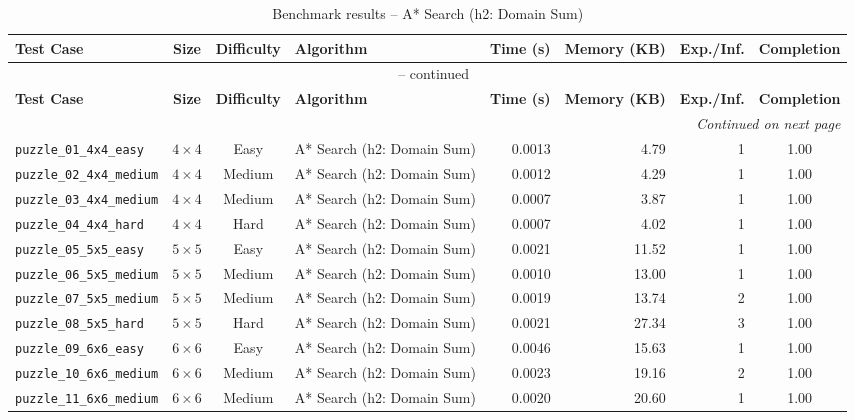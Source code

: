 \documentclass{article}
\begin{document}
\begin{longtable}{@{}lccl r r r c@{}}
  \caption{Benchmark results -- A* Search (h2: Domain Sum)} \label{tab:a__search__h2__domain_sum} \\
  \toprule
  \textbf{Test Case} & \textbf{Size} & \textbf{Difficulty} & \textbf{Algorithm} & \textbf{Time (s)} & \textbf{Memory (KB)} & \textbf{Exp./Inf.} & \textbf{Completion} \\
  \midrule
  \endfirsthead
  \multicolumn{8}{c}{\tablename\ \thetable{} -- continued} \\
  \toprule
  \textbf{Test Case} & \textbf{Size} & \textbf{Difficulty} & \textbf{Algorithm} & \textbf{Time (s)} & \textbf{Memory (KB)} & \textbf{Exp./Inf.} & \textbf{Completion} \\
  \midrule
  \endhead
  \midrule
  \multicolumn{8}{r}{\textit{Continued on next page}} \\
  \endfoot
  \bottomrule
  \endlastfoot
  \texttt{puzzle\_01\_4x4\_easy} & $4\times4$ & Easy & A* Search (h2: Domain Sum) & 0.0013 & 4.79 & 1 & 1.00 \\
  \texttt{puzzle\_02\_4x4\_medium} & $4\times4$ & Medium & A* Search (h2: Domain Sum) & 0.0012 & 4.29 & 1 & 1.00 \\
  \texttt{puzzle\_03\_4x4\_medium} & $4\times4$ & Medium & A* Search (h2: Domain Sum) & 0.0007 & 3.87 & 1 & 1.00 \\
  \texttt{puzzle\_04\_4x4\_hard} & $4\times4$ & Hard & A* Search (h2: Domain Sum) & 0.0007 & 4.02 & 1 & 1.00 \\
  \texttt{puzzle\_05\_5x5\_easy} & $5\times5$ & Easy & A* Search (h2: Domain Sum) & 0.0021 & 11.52 & 1 & 1.00 \\
  \texttt{puzzle\_06\_5x5\_medium} & $5\times5$ & Medium & A* Search (h2: Domain Sum) & 0.0010 & 13.00 & 1 & 1.00 \\
  \texttt{puzzle\_07\_5x5\_medium} & $5\times5$ & Medium & A* Search (h2: Domain Sum) & 0.0019 & 13.74 & 2 & 1.00 \\
  \texttt{puzzle\_08\_5x5\_hard} & $5\times5$ & Hard & A* Search (h2: Domain Sum) & 0.0021 & 27.34 & 3 & 1.00 \\
  \texttt{puzzle\_09\_6x6\_easy} & $6\times6$ & Easy & A* Search (h2: Domain Sum) & 0.0046 & 15.63 & 1 & 1.00 \\
  \texttt{puzzle\_10\_6x6\_medium} & $6\times6$ & Medium & A* Search (h2: Domain Sum) & 0.0023 & 19.16 & 2 & 1.00 \\
  \texttt{puzzle\_11\_6x6\_medium} & $6\times6$ & Medium & A* Search (h2: Domain Sum) & 0.0020 & 20.60 & 1 & 1.00 \\

\end{longtable}
\end{document}
